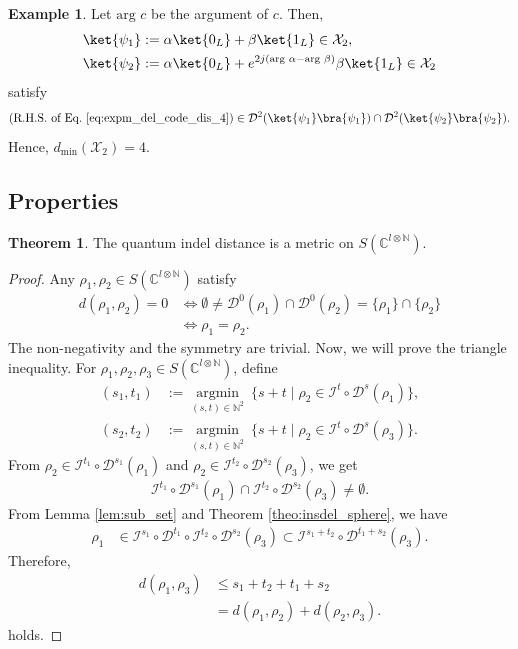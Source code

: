 \documentclass[reprint,amsmath,amssymb,aps,]{revtex4-2}
\theoremstyle{definition}
\newtheorem{exam}{Example}
\newtheorem{theo}{Theorem}
\newcommand{\SET}[1]{\mathbb{#1}}
\newcommand{\N}{\SET{N}}
\newcommand{\C}{\SET{C}}
\newcommand{\1}{\mbox{1}\hspace{-0.25em}\mbox{l}}%
\newcommand{\pure}[2]{\C^{#1 \otimes #2}}
\newcommand{\state}[2]{S(\pure{#1}{#2})}
\newcommand{\QU}[1]{\mathcal{#1}}
\begin{document}
\begin{exam}
  Let $\text{arg } c$ be the argument of $c$.
  Then,
  \begin{align*}
    \ket{\psi_1}
    &:=
    \alpha \ket{0_L} + \beta \ket{1_L} \in \QU{X}_2,\\
    \ket{\psi_2}
    &:=
    \alpha \ket{0_L} + e^{2j( \text{arg } \alpha - \text{arg } \beta )}
    \beta \ket{1_L} \in \QU{X}_2
  \end{align*}
  satisfy
  \begin{align*}
    \text{(R.H.S. of Eq.~\eqref{eq:expm_del_code_dis_4})}
    \in
    \QU{D}^2(\ket{\psi_1}\bra{\psi_1})
    \cap
    \QU{D}^2(\ket{\psi_2}\bra{\psi_2}).
  \end{align*}
  Hence,
  $d_{\text{min}}(\QU{X}_2) = 4$.
\end{exam}

\subsection{Properties}
\begin{theo}
  The quantum indel distance is a metric on $\state{l}{\N}$.
\end{theo}

\begin{proof}
  Any $\rho_1, \rho_2 \in \state{l}{\N}$ satisfy
  \begin{align*}
    d(\rho_1, \rho_2) = 0
    &\iff
    \emptyset
    \neq
    \QU{D}^0(\rho_1) \cap \QU{D}^0(\rho_2)
    =
    \{ \rho_1 \} \cap \{ \rho_2 \}\\
    &\iff
    \rho_1 = \rho_2.
  \end{align*}
  The non-negativity and the symmetry are trivial.
  Now,
  we will prove the triangle inequality.
  For $\rho_1, \rho_2, \rho_3 \in \state{l}{\N}$,
  define
  \begin{align*}
    (s_1,t_1)
    &:=
    \underset{(s,t) \in \N^2}{\operatorname{argmin}}~
    \{
    s+t
    \mid
    \rho_2 \in \QU{I}^{t} \circ \QU{D}^{s}(\rho_1)
    \},\\
    (s_2,t_2)
    &:=
    \underset{(s,t) \in \N^2}{\operatorname{argmin}}~
    \{
    s+t
    \mid
    \rho_2 \in \QU{I}^{t} \circ \QU{D}^{s}(\rho_3)
    \}.
  \end{align*}
  From $\rho_2 \in \QU{I}^{t_1} \circ \QU{D}^{s_1}(\rho_1)$ and
  $\rho_2 \in \QU{I}^{t_2} \circ \QU{D}^{s_2}(\rho_3)$,
  we get
  \begin{align*}
    \QU{I}^{t_1} \circ \QU{D}^{s_1}(\rho_1)
    \cap
    \QU{I}^{t_2} \circ \QU{D}^{s_2}(\rho_3)
    \neq
    \emptyset.
  \end{align*}
  From Lemma \ref{lem:sub_set} and Theorem \ref{theo:insdel_sphere},
  we have
  \begin{align*}
    \rho_1 
    &\in
    \QU{I}^{s_1} \circ \QU{D}^{t_1} \circ \QU{I}^{t_2} \circ \QU{D}^{s_2}(\rho_3)
    \subset
    \QU{I}^{s_1+t_2} \circ \QU{D}^{t_1+s_2}(\rho_3).    
  \end{align*}
  Therefore,
  \begin{align*}
    d(\rho_1 ,\rho_3)
    &\leq
    s_1+t_2 + t_1+s_2\\
    &=
    d(\rho_1, \rho_2) + d(\rho_2, \rho_3).
  \end{align*}
  holds.
\end{proof}
\end{document}
